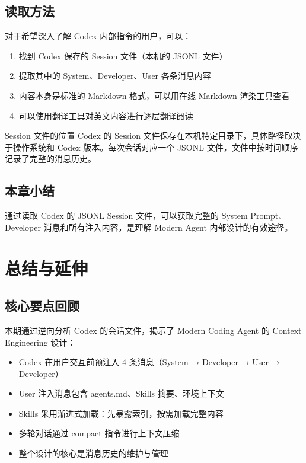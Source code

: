 \documentclass[a4paper]{article}
\begin{document}
\subsection{读取方法}

对于希望深入了解 Codex 内部指令的用户，可以：

\begin{enumerate}
    \item 找到 Codex 保存的 Session 文件（本机的 JSONL 文件）
    \item 提取其中的 System、Developer、User 各条消息内容
    \item 内容本身是标准的 Markdown 格式，可以用在线 Markdown 渲染工具查看
    \item 可以使用翻译工具对英文内容进行逐层翻译阅读
\end{enumerate}

\begin{warningbox}{Session 文件的位置}
Codex 的 Session 文件保存在本机特定目录下，具体路径取决于操作系统和 Codex 版本。每次会话对应一个 JSONL 文件，文件中按时间顺序记录了完整的消息历史。
\end{warningbox}

\subsection{本章小结}

通过读取 Codex 的 JSONL Session 文件，可以获取完整的 System Prompt、Developer 消息和所有注入内容，是理解 Modern Agent 内部设计的有效途径。


\section{总结与延伸}

\subsection{核心要点回顾}

本期通过逆向分析 Codex 的会话文件，揭示了 Modern Coding Agent 的 Context Engineering 设计：

\begin{itemize}
    \item Codex 在用户交互前预注入 4 条消息（System → Developer → User → Developer）
    \item User 注入消息包含 agents.md、Skills 摘要、环境上下文
    \item Skills 采用渐进式加载：先暴露索引，按需加载完整内容
    \item 多轮对话通过 compact 指令进行上下文压缩
    \item 整个设计的核心是消息历史的维护与管理
\end{itemize}
\end{document}
